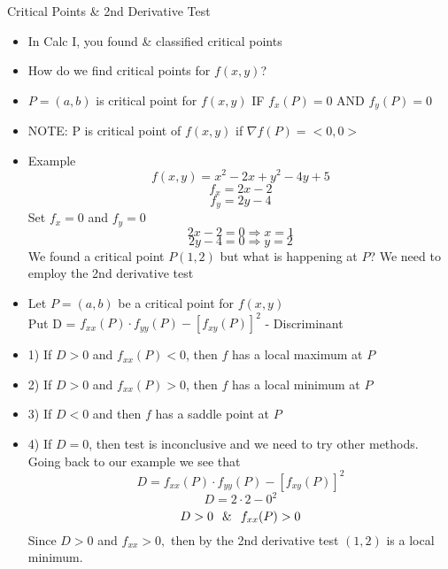 \documentclass[12pt,letterpaper, onecolumn]{exam}
\begin{document}
		\noindent Critical Points \& 2nd Derivative Test\\
		\begin{itemize}
			\item In Calc I, you found \& classified critical points
			\item How do we find critical points for $f(x,y)$?
			\item $P=(a,b)$ is critical point for $f(x,y)$ IF $f_x(P)=0$ AND $f_y(P)=0$
			\item NOTE: P is critical point of $f(x,y)$ if $\nabla f(P)=<0,0>$
			\item Example
			$$f(x,y)=x^2-2x+y^2-4y+5$$
			$$f_x=2x-2$$
			$$f_y=2y-4$$
			Set $f_x=0$ and $f_y=0$
				$$2x-2=0 \Longrightarrow x=1$$
			$$2y-4=0 \Longrightarrow y=2$$
			We found a critical point $P(1,2)$ but what is happening at $P$? We need to employ the 2nd derivative test
			\item Let $P=(a,b)$ be a critical point for $f(x,y)$\\
			Put D = $f_{xx}(P)\cdot f_{yy}(P)-[f_{xy}(P)]^2$ - Discriminant
			\item 1) If $D>0$ and $f_{xx}(P)<0$, then $f$ has a local maximum at $P$
			\item 2) If $D>0$ and $f_{xx}(P)>0$, then $f$ has a local minimum at $P$
			\item 3) If $D<0$ and then $f$ has a saddle point at $P$
			\item 4) If $D=0$, then test is inconclusive and we need to try other methods.\\
			Going back to our example we see that
			$$D=f_{xx}(P)\cdot f_{yy}(P)-[f_{xy}(P)]^2$$
			$$D=2\cdot2-0^2$$
			$$D>0 \hspace*{0.25cm}\&\hspace*{0.25cm} f_{xx}(P)>0$$
			Since $D>0$ and $f_{xx}>0,$ then by the 2nd derivative test $(1,2)$ is a local minimum.
		\end{itemize}
\end{document}
